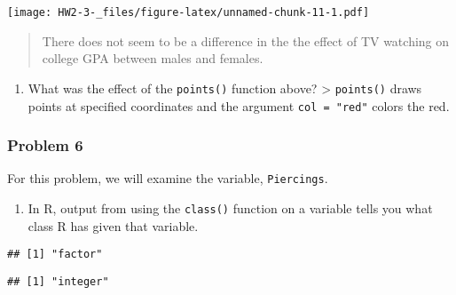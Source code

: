 \documentclass[]{article}
\newenvironment{Shaded}{\begin{snugshade}}{\end{snugshade}}
\newcommand{\KeywordTok}[1]{\textcolor[rgb]{0.13,0.29,0.53}{\textbf{#1}}}
\newcommand{\NormalTok}[1]{#1}
\newcommand{\OperatorTok}[1]{\textcolor[rgb]{0.81,0.36,0.00}{\textbf{#1}}}
\providecommand{\tightlist}{%
  \setlength{\itemsep}{0pt}\setlength{\parskip}{0pt}}
\begin{document}
\texttt{[image: HW2-3-\_files/figure-latex/unnamed-chunk-11-1.pdf]}

\begin{quote}
There does not seem to be a difference in the the effect of TV watching
on college GPA between males and females.
\end{quote}

\begin{enumerate}
\def\labelenumi{\alph{enumi})}
\setcounter{enumi}{4}
\tightlist
\item
  What was the effect of the \texttt{points()} function above?
  \textgreater{} \texttt{points()} draws points at specified coordinates
  and the argument \texttt{col\ =\ "red"} colors the red.
\end{enumerate}

\hypertarget{problem-6}{%
\subsubsection{Problem 6}\label{problem-6}}

For this problem, we will examine the variable, \texttt{Piercings}.

\begin{enumerate}
\def\labelenumi{\alph{enumi})}
\tightlist
\item
  In R, output from using the \texttt{class()} function on a variable
  tells you what class R has given that variable.
\end{enumerate}

\begin{Shaded}
\end{Shaded}

\begin{verbatim}
## [1] "factor"
\end{verbatim}

\begin{Shaded}
\end{Shaded}

\begin{verbatim}
## [1] "integer"
\end{verbatim}

\begin{Shaded}
\end{Shaded}
\end{document}
